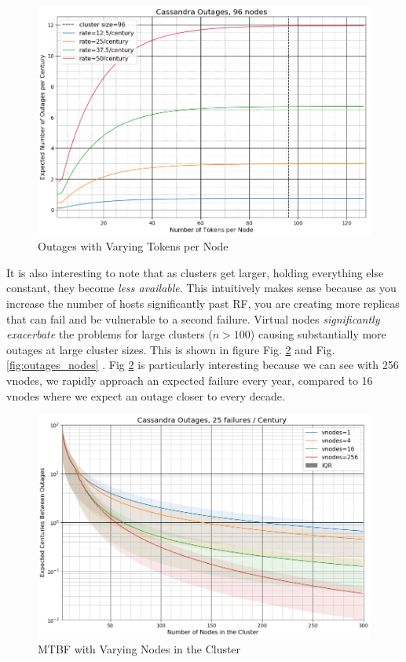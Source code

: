 \documentclass{article}
\begin{document}
\begin{figure}[H]
    \centering
    \includegraphics[width=1.0\textwidth]{images/outages_all_vnodes.png}
    \caption{Outages with Varying Tokens per Node}
    \label{fig:outages_all_vnodes}
\end{figure}

It is also interesting to note that as clusters get larger, holding everything
else constant, they become \textit{less available}. This intuitively makes
sense because as you increase the number of hosts significantly past RF,
you are creating more replicas that can fail and be vulnerable to a second
failure. Virtual nodes \textit{significantly exacerbate} the problems for
large clusters ($n > 100$) causing substantially more outages at large cluster
sizes. This is shown in figure Fig. \ref{fig:outages_nodes_mtbf} and
Fig. \ref{fig:outages_nodes} . Fig \ref{fig:outages_nodes_mtbf} is
particularly interesting because we can see with 256 vnodes, we rapidly
approach an expected failure every year, compared to 16 vnodes where we
expect an outage closer to every decade.

\begin{figure}[h!]
    \centering
    \includegraphics[width=1.0\textwidth]{images/outages_nodes_mtbf.png}
    \caption{MTBF with Varying Nodes in the Cluster}
    \label{fig:outages_nodes_mtbf}
\end{figure}
\end{document}
